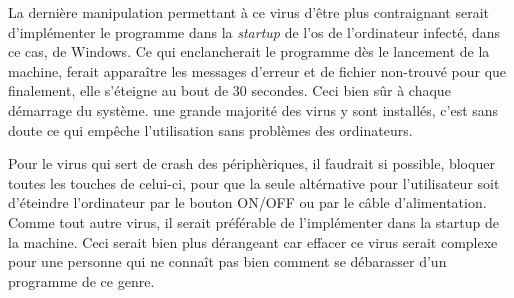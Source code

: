 La dernière manipulation permettant à ce virus d'être plus contraignant serait d'implémenter le programme dans la \textit{startup} de l'os de l'ordinateur infecté, dans ce cas, de Windows. Ce qui enclancherait le programme dès le lancement de la machine, ferait apparaître les messages d'erreur et de fichier non-trouvé pour que finalement, elle s'éteigne au bout de 30 secondes. Ceci bien sûr à chaque démarrage du système. une grande majorité des virus y sont installés, c'est sans doute ce qui empêche l'utilisation sans problèmes des ordinateurs.         

Pour le virus qui sert de crash des périphèriques, il faudrait si possible, bloquer toutes les touches de celui-ci, pour que la seule altérnative pour l'utilisateur soit d'éteindre l'ordinateur par le bouton ON/OFF ou par le câble d'alimentation. Comme tout autre virus, il serait préférable de l'implémenter dans la startup de la machine. Ceci serait bien plus dérangeant car effacer ce virus serait complexe pour une personne qui ne connaît pas bien comment se débarasser d'un programme de ce genre.
